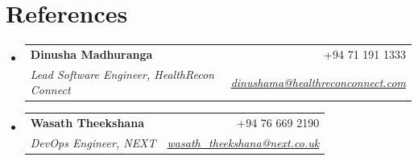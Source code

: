 \documentclass[letterpaper,11pt]{article}
\makeatletter
\newcommand{\resumeSubheading}[4]{
  \vspace{-2pt}\item
    \begin{tabular*}{0.97\textwidth}[t]{l@{\extracolsep{\fill}}r}
      \textbf{#1} & #2 \\
      \textit{\small#3} & \textit{\small #4} \\
    \end{tabular*}\vspace{-7pt}
}
\newcommand{\resumeSubHeadingListStart}{\begin{itemize}[leftmargin=0.15in, label={}]}
\newcommand{\resumeSubHeadingListEnd}{\end{itemize}}
\makeatother
\begin{document}
\section{References}
  \resumeSubHeadingListStart

    \resumeSubheading
      {Dinusha Madhuranga}{+94 71 191 1333}
      {Lead Software Engineer, HealthRecon Connect}{\href{mailto:dinushama@healthreconconnect.com}{dinushama@healthreconconnect.com}}

    \resumeSubheading
      {Wasath Theekshana}{+94 76 669 2190}
      {DevOps Engineer, NEXT}{\href{mailto:wasath_theekshana@next.co.uk}{wasath\_theekshana@next.co.uk}}

  \resumeSubHeadingListEnd
  
\end{document}
